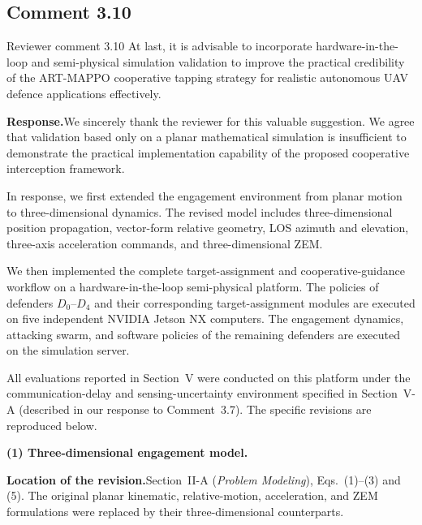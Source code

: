 \documentclass[11pt]{article}
\newcommand{\rsp}{\medskip\noindent\textbf{Response.}\quad}
\newcommand{\loc}{\medskip\noindent\textbf{Location of the revision.}\quad}
\begin{document}

\subsection*{Comment 3.10}

\begin{reviewercomment}{Reviewer comment 3.10}
At last, it is advisable to incorporate hardware-in-the-loop and
semi-physical simulation validation to improve the practical credibility of
the ART-MAPPO cooperative tapping strategy for realistic autonomous UAV
defence applications effectively.
\end{reviewercomment}

\rsp We sincerely thank the reviewer for this valuable suggestion. We agree
that validation based only on a planar mathematical simulation is
insufficient to demonstrate the practical implementation capability of the
proposed cooperative interception framework.

In response, we first extended the engagement environment from planar motion
to three-dimensional dynamics. The revised model includes three-dimensional
position propagation, vector-form relative geometry, LOS azimuth and
elevation, three-axis acceleration commands, and three-dimensional ZEM. 

We then implemented the complete target-assignment and cooperative-guidance
workflow on a hardware-in-the-loop semi-physical platform. The policies of
defenders $D_0$--$D_4$ and their corresponding target-assignment modules are
executed on five independent NVIDIA Jetson NX computers. The engagement
dynamics, attacking swarm, and software policies of the remaining defenders
are executed on the simulation server. 

All evaluations reported in Section~V were conducted on this platform under
the communication-delay and sensing-uncertainty environment specified in
Section~V-A (described in our response to Comment~3.7). The specific
revisions are reproduced below.

\medskip
\noindent\textbf{(1) Three-dimensional engagement model.}

\loc Section~II-A (\emph{Problem Modeling}), Eqs.~(1)--(3) and (5). The
original planar kinematic, relative-motion, acceleration, and ZEM
formulations were replaced by their three-dimensional counterparts.
\end{document}
